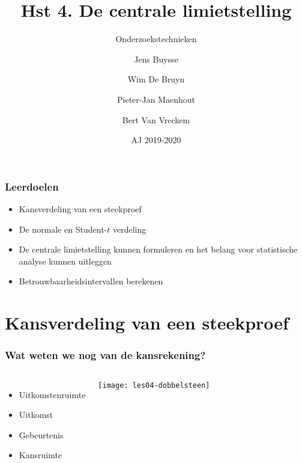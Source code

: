 \documentclass[aspectratio=169]{beamer}
\title[OZT: aan de slag]{Hst 4. De centrale limietstelling}
\subtitle{Onderzoekstechnieken}
\author{Jens Buysse \and Wim {De Bruyn} \and Pieter-Jan Maenhout \and Bert {Van Vreckem}}
\date{AJ 2019-2020}
\begin{document}
\begin{frame}
  \maketitle
\end{frame}

\begin{frame}
  \frametitle{Leerdoelen}
  
  \begin{itemize}
    \item Kansverdeling van een steekproef
    \item De normale en Student-$t$ verdeling
    \item De centrale limietstelling kunnen formuleren en het belang voor statistische analyse kunnen uitleggen
    \item Betrouwbaarheidsintervallen berekenen
  \end{itemize}
\end{frame}

\section{Kansverdeling van een steekproef}

\begin{frame}
  \frametitle{Wat weten we nog van de kansrekening?}
  
  \begin{columns}
    \begin{itemize}
      \item Uitkomstenruimte
      \item Uitkomst
      \item Gebeurtenis
      \item Kansruimte
    \end{itemize}
    
    \centering
    \texttt{[image: les04-dobbelsteen]}
  \end{columns}
  
\end{frame}
\end{document}
